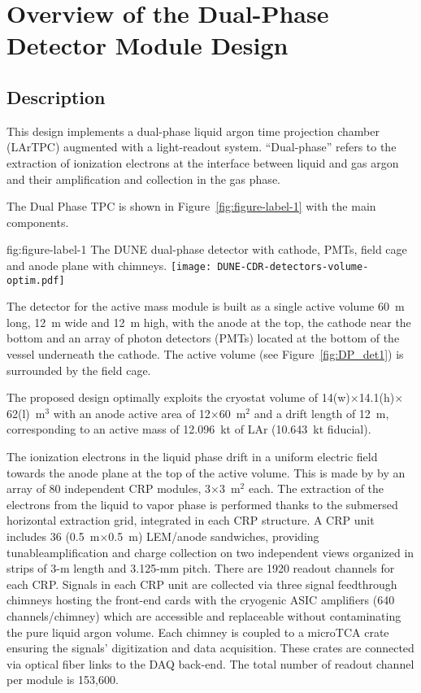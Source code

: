 \chapter{Overview of the Dual-Phase Detector Module Design}
\label{ch:fddp-ov}


\section{Description}
\label{sec:fddp-ov-description}
This design implements a dual-phase liquid argon
time projection chamber (LArTPC) augmented with a light-readout
system. ``Dual-phase'' refers to the extraction of ionization
electrons at the interface between liquid and gas argon and their
amplification and collection in the gas phase.

The Dual Phase TPC is shown in Figure~\ref{fig:figure-label-1} with the main components.

\begin{dunefigure}{fig:figure-label-1}
{The DUNE dual-phase 
detector with cathode, PMTs, field cage and anode plane with chimneys.}
\texttt{[image: DUNE-CDR-detectors-volume-optim.pdf]}
\end{dunefigure}
The detector for the  active mass module is built as a single
active volume 60~m long, 12~m wide and 12~m high, with the anode at the
top, the cathode near the bottom and an array of photon detectors (PMTs)
located at the bottom of the vessel underneath the cathode. 
The active volume (see Figure~\ref{fig:DP_det1}) is surrounded by the
field cage.

The proposed design optimally exploits the
cryostat volume of 14(w)$\times$14.1(h)$\times$62(l)~m$^3$ with an
anode active area of 12$\times$60~m$^2$ and a drift length of 12~m,
corresponding to an active mass of 12.096~kt of LAr (10.643~kt
fiducial).

The ionization electrons in the liquid phase drift  in a uniform electric field towards the anode plane at the top of the active
volume. This is made by by an array of 80 independent CRP modules, 3$\times$3~m$^2$ each.
The extraction of the electrons from the liquid to vapor phase is performed thanks to the submersed horizontal extraction grid, 
integrated in each CRP structure. A CRP unit includes 36 (0.5~m$\times$0.5~m) LEM/anode sandwiches, providing tunableamplification and charge collection on two independent views organized in strips of 3-m length and 3.125-mm pitch. There are 1920 readout channels for each CRP. Signals in each CRP unit are collected via three signal feedthrough chimneys hosting the front-end cards with the cryogenic ASIC amplifiers (640 channels/chimney) which are accessible and replaceable without contaminating the pure liquid argon volume. Each chimney is coupled to a microTCA crate ensuring the signals' digitization and 
data acquisition. These crates are connected  via optical fiber links to the DAQ back-end. The total number of readout channel 
per  module is 153,600.
 
